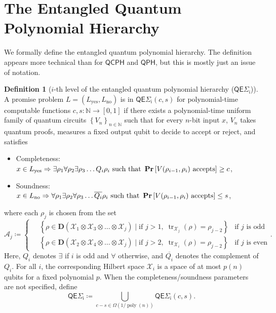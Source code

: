 \documentclass[11pt]{article}
\theoremstyle{definition}
\newtheorem{definition}[theorem]{Definition}
\renewcommand{\Pr}{\mathop{\bf Pr\/}}
\DeclareMathOperator{\tr}{tr}
\DeclareMathOperator{\poly}{poly}
\newcommand{\yes}{\text{yes}}
\newcommand{\no}{\text{no}}
\newcommand{\nats}{\mathbb N}
\newcommand{\N}{\nats}
\newcommand{\class}[1]{\ensuremath{\mathsf{#1}}\xspace}
\newcommand{\QCPH}{\class{QCPH}}
\newcommand{\QPH}{\class{QPH}}
\newcommand{\entQSigmai}[1][i]{\class{QE\Sigma_{#1}}}
\newcommand{\calA}{\mathcal{A}}
\newcommand{\calX}{\mathcal{X}}
\begin{document}
\section{The Entangled Quantum Polynomial Hierarchy}\label{sec:prelim-entqph}

We formally define the entangled quantum polynomial hierarchy. 
The definition appears more technical than for $\QCPH$ and $\QPH$, but this is mostly just an issue of notation.

\begin{definition}[$i$-th level of the entangled quantum polynomial hierarchy ($\entQSigmai $)] \label{def:entqsigmai}
    A promise problem $L=(L_\yes, L_\no)$ is in $\entQSigmai(c,s)$ for polynomial-time computable functions $c, s: \N \to [0,1]$ if there exists a polynomial-time uniform family of quantum circuits $\left\{V_n \right\}_{n \in \N}$ such that for every $n$-bit input $x$, $V_n$ takes quantum proofs, measures a fixed output qubit to decide to accept or reject, and satisfies 
    \begin{itemize}
        \item Completeness: $ x \in L_\yes \Rightarrow  \exists \rho_1 \forall \rho_2 \exists \rho_3 \dots Q_i \rho_i \text{ such that } \Pr\left[ V(\rho_{i-1}, \rho_i) \text{ accepts}\right] \geq c $,
        \item Soundness: $ x\in L_\no \Rightarrow  \forall \rho_1 \exists \rho_2  \forall \rho_3 \dots \overline{Q_i} \rho_i  \text{ such that } \Pr\left[ V(\rho_{i-1}, \rho_i) \text{ accepts}\right] \leq s $,
    \end{itemize}
    where each $\rho_j$ is chosen from the set  
    \begin{equation*}
    \calA_j \coloneqq \begin{cases}
        \quad\left\{ \rho \in \mathbf{D}\left(\calX_1\otimes \calX_3 \otimes \dots \otimes \calX_{j}\right) \mid \text{if }j>1,\; \tr_{\calX_j}\left(\rho\right) = \rho_{j-2} \right\} & \text{if $j$ is odd}  \\
        \quad\left\{ \rho \in \mathbf{D}\left( \calX_2\otimes \calX_4 \otimes \dots \otimes \calX_{j}\right) \mid  \text{if }j>2,\; \tr_{\calX_i}\left(\rho\right) = \rho_{j-2} \right\} & \text{if $j$ is even}
    \end{cases} .
    \end{equation*}
    Here, $Q_i$ denotes $\exists$ if $i$ is odd and $\forall$ otherwise, and $\overline{Q_i}$ denotes the complement of $Q_i$. For all $i$, the corresponding Hilbert space $\calX_i$ is a space of at most $p(n)$ qubits for a fixed polynomial $p$.
    When the completeness/soundness parameters are not specified, define
    \[
        \entQSigmai[i] \coloneqq \bigcup_{c-s \in \Omega\left(1/\poly(n)\right)} \entQSigmai[i](c,s).
    \]
\end{definition}
\end{document}
